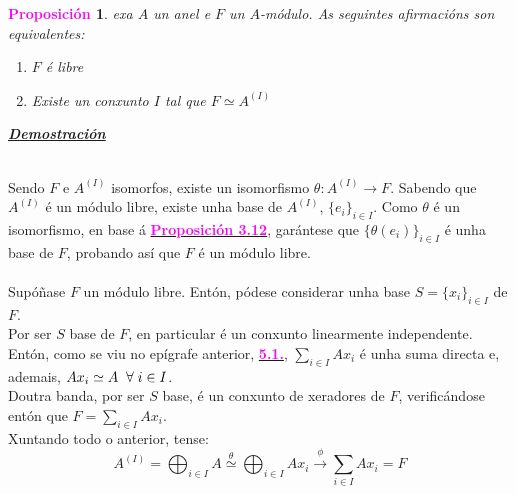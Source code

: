\documentclass[twoside]{report}
\newcommand{\magbf}[1]{\textcolor{magenta}{\textbf{#1}}} %
\theoremstyle{mystyle}
\newtheorem{prop}{\magbf{Proposición}}[chapter]
\newenvironment{proposition}
{\begin{mdframed}[linecolor = magenta,backgroundcolor = classicrose, linewidth = 2mm]\begin{prop}}
{\end{prop}\end{mdframed}}
\begin{document}
\vspace{3mm}

\begin{proposition} \label{prop3.13}
exa $A$ un anel e $F$ un $A$-módulo. As seguintes afirmacións son equivalentes:
\begin{enumerate}
    \item $F$ é libre
    \item Existe un conxunto $I$ tal que $F \simeq A^{(I)}$
\end{enumerate}
\end{proposition}

\vspace{2mm}

\noindent \textbf{\textit{\underline{Demostración}}}

\vspace{2mm}

\noindent {}\\

\noindent Sendo $F$ e $A^{(I)}$ isomorfos, existe un isomorfismo $\theta :  A^{(I)} \longrightarrow F$. Sabendo que $A^{(I)}$ é un módulo libre, existe unha base de $A^{(I)}$, $\{e_{i}\}_{i \in I}$. Como $\theta$ é un isomorfismo, en base á \hyperref[prop3.12]{\magbf{Proposición 3.12}}, garántese que $\{\theta(e_{i})\}_{i \in I}$ é unha base de $F$, probando así que $F$ é un módulo libre.\\

\noindent {}\\

\noindent Supóñase $F$ un módulo libre. Entón, pódese considerar unha base $S = \{x_{i}\}_{i \in I}$ de $F$.\\

\noindent Por ser $S$ base de $F$, en particular é un conxunto linearmente independente. Entón, como se viu no epígrafe anterior, \hyperref[sec:5.1]{\magbf{5.1.}}, $\underset{i \in I}{\sum} Ax_{i}$ é unha suma directa e, ademais, $Ax_{i} \simeq A \hspace{2mm} \forall \hspace{1mm} i \in I$.\\

\noindent Doutra banda, por ser $S$ base, é un conxunto de xeradores de $F$, verificándose entón que $F = \displaystyle \sum_{i \in I} Ax_{i}$.\\

\noindent Xuntando todo o anterior, tense:
$$ A^{(I)} = \displaystyle \bigoplus_{i \in I} A \overset{\theta}{\simeq} \displaystyle \bigoplus_{i \in I} Ax_{i} \overset{\phi}{\longrightarrow} \displaystyle \sum_{i \in I} Ax_{i} = F$$
\end{document}
